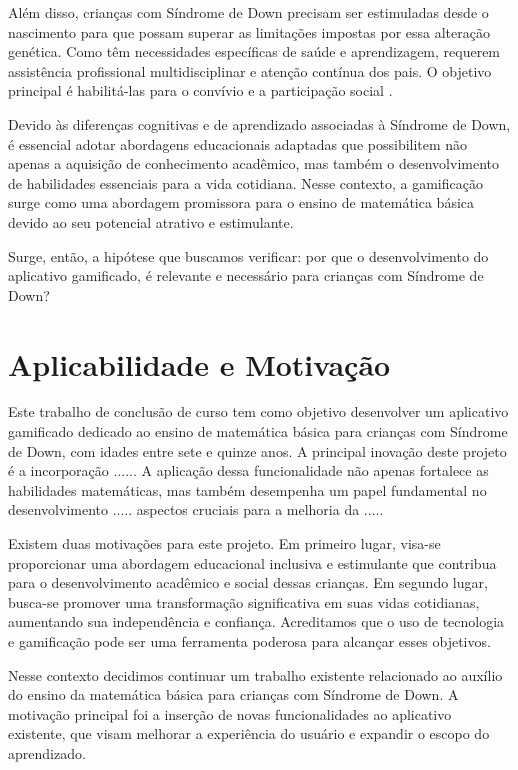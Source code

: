 Além disso, crianças com Síndrome de Down precisam ser estimuladas desde o nascimento para que possam superar as limitações impostas por essa alteração genética. Como têm necessidades específicas de saúde e aprendizagem, requerem assistência profissional multidisciplinar e atenção contínua dos pais. O objetivo principal é habilitá-las para o convívio e a participação social \cite{mariahelenavarellabruna2011}. 

Devido às diferenças cognitivas e de aprendizado associadas à Síndrome de Down, é essencial adotar abordagens educacionais adaptadas que possibilitem não apenas a aquisição de conhecimento acadêmico, mas também o desenvolvimento de habilidades essenciais para a vida cotidiana. Nesse contexto, a gamificação surge como uma abordagem promissora para o ensino de matemática básica devido ao seu potencial atrativo e estimulante.

Surge, então, a hipótese que buscamos verificar: por que o desenvolvimento do aplicativo gamificado, é relevante e necessário para crianças com Síndrome de Down?

\section{Aplicabilidade e Motivação}\label{chp:aplic}
Este trabalho de conclusão de curso tem como objetivo desenvolver um aplicativo gamificado dedicado ao ensino de matemática básica para crianças com Síndrome de Down, com idades entre sete e quinze anos. A principal inovação deste projeto é a incorporação ...... A aplicação dessa funcionalidade não apenas fortalece as habilidades matemáticas, mas também desempenha um papel fundamental no desenvolvimento ..... aspectos cruciais para a melhoria da ..... 

Existem duas motivações para este projeto. Em primeiro lugar, visa-se proporcionar uma abordagem educacional inclusiva e estimulante que contribua para o desenvolvimento acadêmico e social dessas crianças. Em segundo lugar, busca-se promover uma transformação significativa em suas vidas cotidianas, aumentando sua independência e confiança. Acreditamos que o uso de tecnologia e gamificação pode ser uma ferramenta poderosa para alcançar esses objetivos. 

Nesse contexto decidimos continuar um trabalho existente relacionado ao auxílio do ensino da matemática básica para crianças com Síndrome de Down. A motivação principal foi a inserção de novas funcionalidades ao aplicativo existente, que visam melhorar a experiência do usuário e expandir o escopo do aprendizado. 

